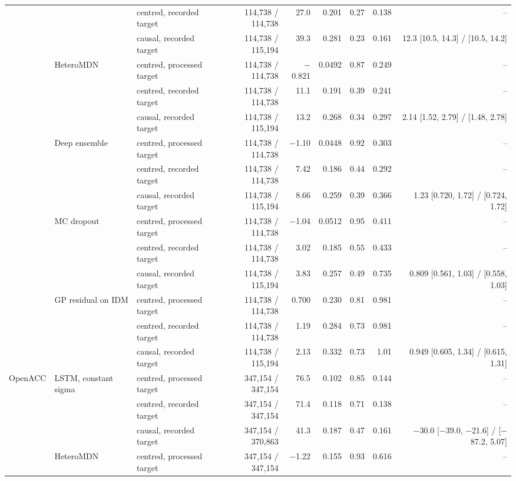\begin{longtable}{lllrrrrrr}
 &  & centred, recorded target & 114,738 / 114,738 & 27.0 & 0.201 & 0.27 & 0.138 & -- \\
 &  & causal, recorded target & 114,738 / 115,194 & 39.3 & 0.281 & 0.23 & 0.161 & 12.3 [10.5, 14.3] / [10.5, 14.2] \\
\midrule
 & HeteroMDN & centred, processed target & 114,738 / 114,738 & $-$0.821 & 0.0492 & 0.87 & 0.249 & -- \\
 &  & centred, recorded target & 114,738 / 114,738 & 11.1 & 0.191 & 0.39 & 0.241 & -- \\
 &  & causal, recorded target & 114,738 / 115,194 & 13.2 & 0.268 & 0.34 & 0.297 & 2.14 [1.52, 2.79] / [1.48, 2.78] \\
\midrule
 & Deep ensemble & centred, processed target & 114,738 / 114,738 & $-$1.10 & 0.0448 & 0.92 & 0.303 & -- \\
 &  & centred, recorded target & 114,738 / 114,738 & 7.42 & 0.186 & 0.44 & 0.292 & -- \\
 &  & causal, recorded target & 114,738 / 115,194 & 8.66 & 0.259 & 0.39 & 0.366 & 1.23 [0.720, 1.72] / [0.724, 1.72] \\
\midrule
 & MC dropout & centred, processed target & 114,738 / 114,738 & $-$1.04 & 0.0512 & 0.95 & 0.411 & -- \\
 &  & centred, recorded target & 114,738 / 114,738 & 3.02 & 0.185 & 0.55 & 0.433 & -- \\
 &  & causal, recorded target & 114,738 / 115,194 & 3.83 & 0.257 & 0.49 & 0.735 & 0.809 [0.561, 1.03] / [0.558, 1.03] \\
\midrule
 & GP residual on IDM & centred, processed target & 114,738 / 114,738 & 0.700 & 0.230 & 0.81 & 0.981 & -- \\
 &  & centred, recorded target & 114,738 / 114,738 & 1.19 & 0.284 & 0.73 & 0.981 & -- \\
 &  & causal, recorded target & 114,738 / 115,194 & 2.13 & 0.332 & 0.73 & 1.01 & 0.949 [0.605, 1.34] / [0.615, 1.31] \\
\midrule
OpenACC & LSTM, constant sigma & centred, processed target & 347,154 / 347,154 & 76.5 & 0.102 & 0.85 & 0.144 & -- \\
 &  & centred, recorded target & 347,154 / 347,154 & 71.4 & 0.118 & 0.71 & 0.138 & -- \\
 &  & causal, recorded target & 347,154 / 370,863 & 41.3 & 0.187 & 0.47 & 0.161 & $-$30.0 [$-$39.0, $-$21.6] / [$-$87.2, 5.07] \\
\midrule
 & HeteroMDN & centred, processed target & 347,154 / 347,154 & $-$1.22 & 0.155 & 0.93 & 0.616 & -- \\

\end{longtable}
